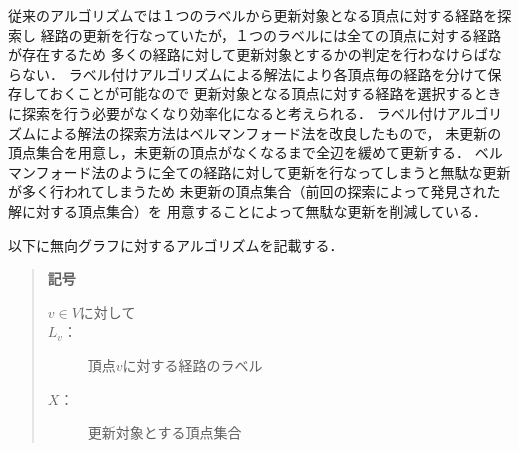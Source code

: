 \documentclass[12pt]{optlab-bachelor}
\begin{document}
従来のアルゴリズムでは１つのラベルから更新対象となる頂点に対する経路を探索し
経路の更新を行なっていたが，１つのラベルには全ての頂点に対する経路が存在するため
多くの経路に対して更新対象とするかの判定を行わなけらばならない．
ラベル付けアルゴリズムによる解法により各頂点毎の経路を分けて保存しておくことが可能なので
更新対象となる頂点に対する経路を選択するときに探索を行う必要がなくなり効率化になると考えられる．
ラベル付けアルゴリズムによる解法の探索方法はベルマンフォード法を改良したもので，
未更新の頂点集合を用意し，未更新の頂点がなくなるまで全辺を緩めて更新する．
ベルマンフォード法のように全ての経路に対して更新を行なってしまうと無駄な更新が多く行われてしまうため
未更新の頂点集合（前回の探索によって発見された解に対する頂点集合）を
用意することによって無駄な更新を削減している．


以下に無向グラフに対するアルゴリズムを記載する．

\begin{quote}
  \textbf{記号}
  \begin{description}
    \item[$v \in V$に対して]
    \item[$L_v$：] 頂点$v$に対する経路のラベル
    \item[$X$：] 更新対象とする頂点集合
  \end{description}
\end{quote}
\end{document}
